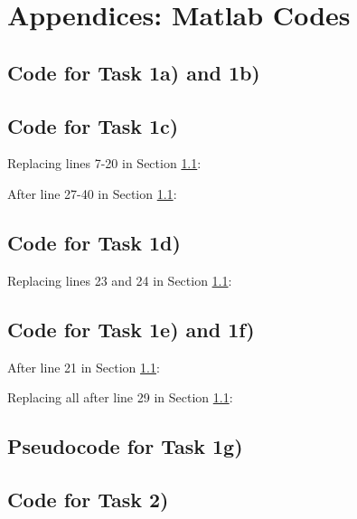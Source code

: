 \documentclass[10pt,a4paper]{article}
\begin{document}
	\section{Appendices: Matlab Codes} %
			
	\subsection{Code for Task 1a) and 1b)}\label{apx_task1a}
	
	
	\pagebreak
	
	\subsection{Code for Task 1c)}\label{apx_task1c}
	Replacing lines 7-20 in Section \ref{apx_task1a}:
	
	\hrulefill
	
	After line 27-40 in Section \ref{apx_task1a}:
	
	\hrulefill
	\subsection{Code for Task 1d)}\label{apx_task1d}
	Replacing lines 23 and 24 in Section \ref{apx_task1a}:
	
	\pagebreak
	
	\subsection{Code for Task 1e) and 1f)}\label{apx_task1e}
	After line 21 in Section \ref{apx_task1a}:
	
	
	\hrulefill
	
	Replacing all after line 29 in Section \ref{apx_task1a}:
	
	
	\subsection{Pseudocode for Task 1g)}\label{apx_task1g}
	
	\pagebreak
	\subsection{Code for Task 2)}\label{apx_Task2}
	
\end{document}
